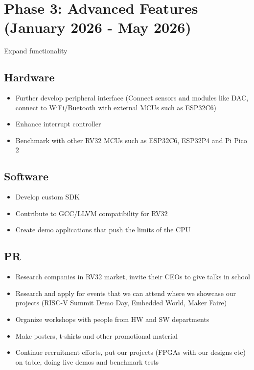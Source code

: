 \documentclass{article}
\begin{document}
\section{Phase 3: Advanced Features (January 2026 - May 2026)}
Expand functionality

\subsection{Hardware}
\begin{itemize}
    \item Further develop peripheral interface (Connect sensors and modules like DAC, connect to WiFi/Buetooth with external MCUs such as ESP32C6)
    \item Enhance interrupt controller
    \item Benchmark with other RV32 MCUs such as ESP32C6, ESP32P4 and Pi Pico 2
\end{itemize}

\subsection{Software}
\begin{itemize}
    \item Develop custom SDK
    \item Contribute to GCC/LLVM compatibility for RV32
    \item Create demo applications that push the limits of the CPU
\end{itemize}

\subsection{PR}
\begin{itemize}
    \item Research companies in RV32 market, invite their CEOs to give talks in school
    \item Research and apply for events that we can attend where we showcase our projects (RISC-V Summit Demo Day, Embedded World, Maker Faire)
    \item Organize workshops with people from HW and SW departments
    \item Make posters, t-shirts and other promotional material
    \item Continue recruitment efforts, put our projects (FPGAs with our designs etc) on table, doing live demos and benchmark tests
\end{itemize}
\end{document}
